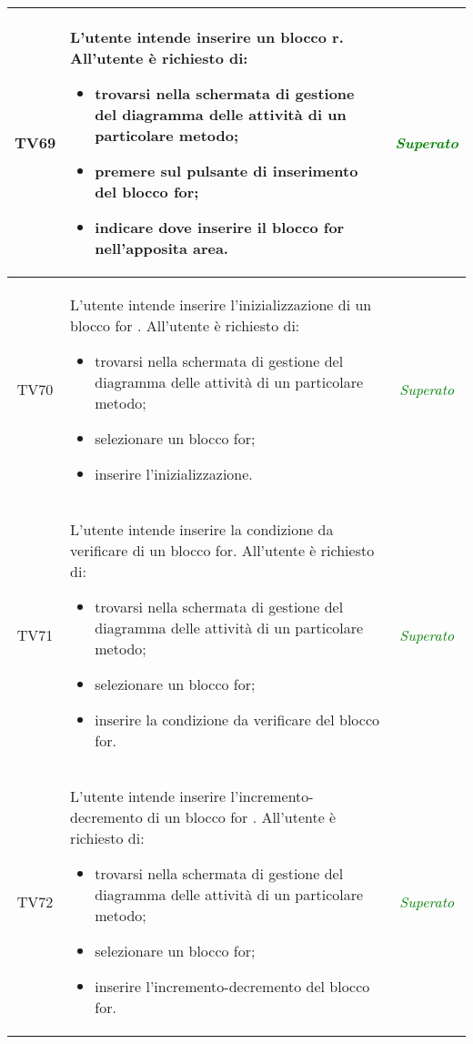 \begin{longtable}{|c|>{}m{8cm}|c|}
\hypertarget{TV4.5}{TV69} & L'utente intende inserire un blocco r.
All'utente è richiesto di:
\begin{itemize}
	\item trovarsi nella schermata di gestione del diagramma delle attività di un particolare metodo;
	\item premere sul pulsante di inserimento del blocco for;
	\item indicare dove inserire il blocco for nell'apposita area.
\end{itemize} & \textcolor{Green}{\textit{Superato}}\\ \hline

\hypertarget{TV4.5.1}{TV70} & L'utente intende inserire l'inizializzazione di un blocco for .
All'utente è richiesto di:
\begin{itemize}
	\item trovarsi nella schermata di gestione del diagramma delle attività di un particolare metodo;
	\item selezionare un blocco for;
	\item inserire l'inizializzazione.
\end{itemize} & \textcolor{Green}{\textit{Superato}}\\ \hline

\hypertarget{TV4.5.2}{TV71} & L'utente intende inserire la condizione da verificare di un blocco for.
All'utente è richiesto di:
\begin{itemize}
	\item trovarsi nella schermata di gestione del diagramma delle attività di un particolare metodo;
	\item selezionare un blocco for;
	\item inserire la condizione da verificare del blocco for.
\end{itemize} & \textcolor{Green}{\textit{Superato}}\\ \hline

\hypertarget{TV4.5.3}{TV72} & L'utente intende inserire l'incremento-decremento di un blocco for .
All'utente è richiesto di:
\begin{itemize}
	\item trovarsi nella schermata di gestione del diagramma delle attività di un particolare metodo;
	\item selezionare un blocco for;
	\item inserire l'incremento-decremento del blocco for.
\end{itemize} & \textcolor{Green}{\textit{Superato}}\\ \hline


\end{longtable}
